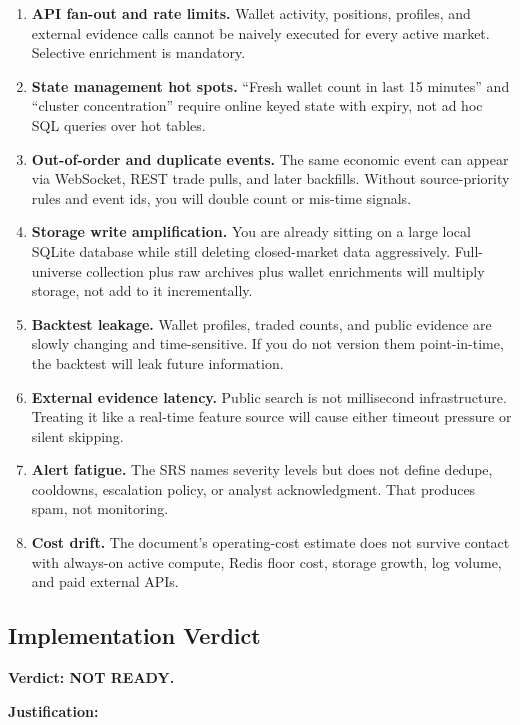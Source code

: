 \documentclass[11pt,letterpaper]{article}
\newcommand{\notready}{\textbf{\textcolor{red!75!black}{NOT READY}}}
\begin{document}
\begin{enumerate}[leftmargin=1.5em]
    \item \textbf{API fan-out and rate limits.} Wallet activity, positions, profiles, and external evidence calls cannot be naively executed for every active market. Selective enrichment is mandatory.
    \item \textbf{State management hot spots.} ``Fresh wallet count in last 15 minutes'' and ``cluster concentration'' require online keyed state with expiry, not ad hoc SQL queries over hot tables.
    \item \textbf{Out-of-order and duplicate events.} The same economic event can appear via WebSocket, REST trade pulls, and later backfills. Without source-priority rules and event ids, you will double count or mis-time signals.
    \item \textbf{Storage write amplification.} You are already sitting on a large local SQLite database while still deleting closed-market data aggressively. Full-universe collection plus raw archives plus wallet enrichments will multiply storage, not add to it incrementally.
    \item \textbf{Backtest leakage.} Wallet profiles, traded counts, and public evidence are slowly changing and time-sensitive. If you do not version them point-in-time, the backtest will leak future information.
    \item \textbf{External evidence latency.} Public search is not millisecond infrastructure. Treating it like a real-time feature source will cause either timeout pressure or silent skipping.
    \item \textbf{Alert fatigue.} The SRS names severity levels but does not define dedupe, cooldowns, escalation policy, or analyst acknowledgment. That produces spam, not monitoring.
    \item \textbf{Cost drift.} The document's operating-cost estimate does not survive contact with always-on active compute, Redis floor cost, storage growth, log volume, and paid external APIs.
\end{enumerate}

\subsection{Implementation Verdict}

\textbf{Verdict: \notready.}

\textbf{Justification:}
\end{document}
